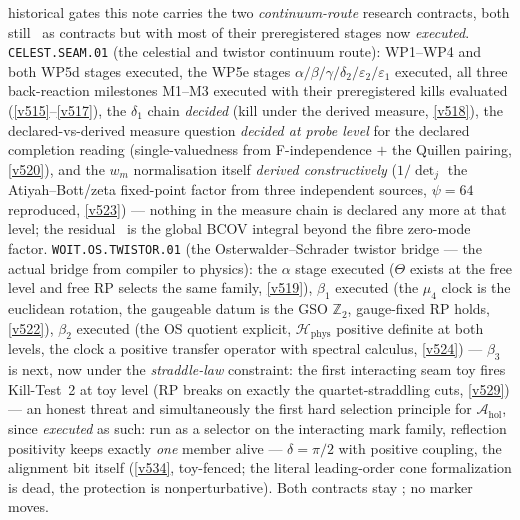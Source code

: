 \documentclass[11pt,a4paper]{article}
\newcommand{\Z}{\mathbb Z}
\begin{document}
\begin{keybox}
historical gates this note carries the two \emph{continuum-route} research contracts, both still
\mO\ as contracts but with most of their preregistered stages now \emph{executed}.
\texttt{CELEST.SEAM.01} (the celestial and twistor continuum route): WP1--WP4 and both WP5d
stages executed, the WP5e stages $\alpha/\beta/\gamma/\delta_2/\varepsilon_2/\varepsilon_1$
executed, all three back-reaction milestones M1--M3 executed with their preregistered kills
evaluated (\vref{v515}--\vref{v517}), the $\delta_1$ chain \emph{decided} (kill under the
derived measure, \vref{v518}), the declared-vs-derived measure question \emph{decided at probe
level} for the declared completion reading (single-valuedness from F-independence $+$ the
Quillen pairing, \vref{v520}), and the $w_m$ normalisation itself \emph{derived constructively}
($1/\det_j$ the Atiyah--Bott/zeta fixed-point factor from three independent sources, $\psi=64$
reproduced, \vref{v523}) --- nothing in the measure chain is declared any more at that level;
the residual \mO\ is the global BCOV integral beyond the fibre zero-mode factor.
\texttt{WOIT.OS.TWISTOR.01} (the Osterwalder--Schrader twistor bridge --- the actual bridge
from compiler to physics): the $\alpha$ stage executed ($\Theta$ exists at the free level and
free RP selects the same family, \vref{v519}), $\beta_1$ executed (the $\mu_4$ clock is the
euclidean rotation, the gaugeable datum is the GSO $\Z_2$, gauge-fixed RP holds, \vref{v522}),
$\beta_2$ executed (the OS quotient explicit, $\mathcal H_{\mathrm{phys}}$ positive definite at
both levels, the clock a positive transfer operator with spectral calculus, \vref{v524}) ---
$\beta_3$ is next, now under the \emph{straddle-law} constraint: the first interacting seam toy
fires Kill-Test~2 at toy level (RP breaks on exactly the quartet-straddling cuts,
\vref{v529}) --- an honest threat and simultaneously the first hard selection principle for
$\mathcal A_{\mathrm{hol}}$, since \emph{executed} as such: run as a selector on the interacting
mark family, reflection positivity keeps exactly \emph{one} member alive --- $\delta=\pi/2$ with
positive coupling, the alignment bit itself (\vref{v534}, toy-fenced; the literal leading-order
cone formalization is dead, the protection is nonperturbative). Both contracts stay \mO; no
marker moves.
\end{keybox}

\end{document}
